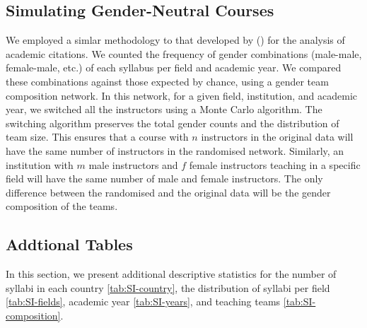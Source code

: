 \documentclass[
  11pt,
]{article}
\begin{document}
\subsection{Simulating Gender-Neutral Courses}\label{si-simulations}

We employed a simlar methodology to that developed by () for the analysis of academic citations. We counted the frequency of gender combinations (male-male, female-male, etc.) of each syllabus per field and academic year. We compared these combinations against those expected by chance, using a gender team composition network. In this network, for a given field, institution, and academic year, we switched all the instructors using a Monte Carlo algorithm. The switching algorithm preserves the total gender counts and the distribution of team size. This ensures that a course with \(n\) instructors in the original data will have the same number of instructors in the randomised network. Similarly, an institution with \(m\) male instructors and \(f\) female instructors teaching in a specific field will have the same number of male and female instructors. The only difference between the randomised and the original data will be the gender composition of the teams.

\subsection{Addtional Tables}\label{addtional-tables}

In this section, we present additional descriptive statistics for the number of syllabi in each country \ref{tab:SI-country}, the distribution of syllabi per field \ref{tab:SI-fields}, academic year \ref{tab:SI-years}, and teaching teams \ref{tab:SI-composition}.
\end{document}
